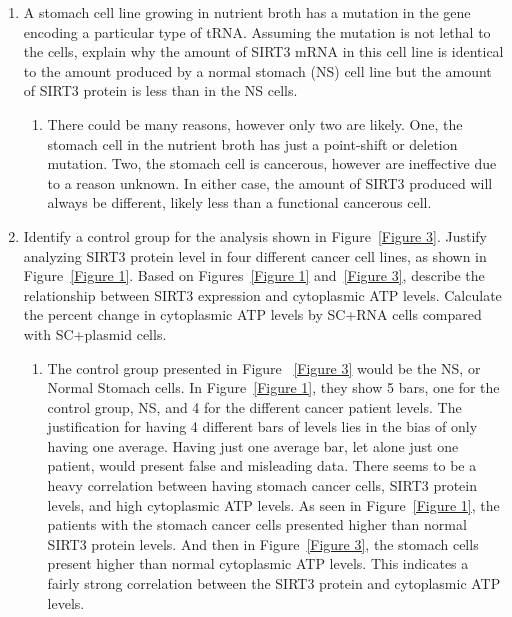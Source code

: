\documentclass[11pt]{article}
\begin{document}
    \begin{enumerate}
        \item A stomach cell line growing in nutrient broth has a mutation in the gene encoding a particular
type of tRNA. Assuming the mutation is not lethal to the cells, explain why the amount
of SIRT3 mRNA in this cell line is identical to the amount produced by a normal stomach (NS)
cell line but the amount of SIRT3 protein is less than in the NS cells.
        \begin{enumerate}
            \item There could be many reasons, however only two are likely.
            One, the stomach cell in the nutrient broth has just a point-shift or deletion mutation.
            Two, the stomach cell is cancerous, however are ineffective due to a reason unknown.
            In either case, the amount of SIRT3 produced will always be different, likely less than a functional cancerous cell.
        \end{enumerate}
        \item Identify a control group for the analysis shown in Figure~\ref{Figure 3}.
        Justify analyzing SIRT3 protein level in
        four different cancer cell lines, as shown in Figure~\ref{Figure 1}.
        Based on Figures~\ref{Figure 1} and~\ref{Figure 3}, describe the
        relationship between SIRT3 expression and cytoplasmic ATP levels.
        Calculate the percent change
        in cytoplasmic ATP levels by SC+RNA cells compared with SC+plasmid cells.
        \begin{enumerate}
            \item The control group presented in Figure ~\ref{Figure 3} would be the NS, or Normal Stomach cells.
            In Figure~\ref{Figure 1}, they show 5 bars, one for the control group, NS, and 4 for the different cancer patient levels.
            The justification for having 4 different bars of levels lies in the bias of only having one average.
            Having just one average bar, let alone just one patient, would present false and misleading data.
            There seems to be a heavy correlation between having stomach cancer cells, SIRT3 protein levels, and high cytoplasmic ATP levels.
            As seen in Figure~\ref{Figure 1}, the patients with the stomach cancer cells presented higher than normal SIRT3 protein levels.
            And then in Figure~\ref{Figure 3}, the stomach cells present higher than normal cytoplasmic ATP levels.
            This indicates a fairly strong correlation between the SIRT3 protein and cytoplasmic ATP levels.

\end{enumerate}
\end{enumerate}
\end{document}
